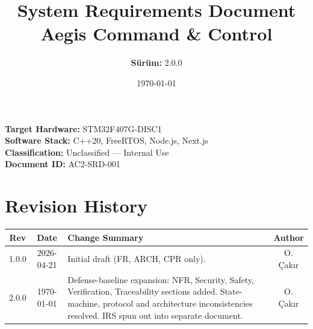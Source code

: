 \documentclass[11pt, a4paper]{article}
\title{
    \vspace{2cm}
    \Huge \textbf{System Requirements Document}\\
    \vspace{1cm}
    \LARGE \textbf{Aegis Command \& Control}\\
    \vspace{2cm}
}
\author{\Large \textbf{Sürüm:} 2.0.0}
\date{\vspace{1cm} \Large \today}
\begin{document}
\maketitle
\thispagestyle{empty}

\vspace{3cm}
\begin{center}
    \Large \textbf{Target Hardware:} STM32F407G-DISC1 \\
    \vspace{0.5cm}
    \Large \textbf{Software Stack:} C++20, FreeRTOS, Node.js, Next.js \\
    \vspace{0.5cm}
    \normalsize \textbf{Classification:} Unclassified — Internal Use \\
    \vspace{0.2cm}
    \normalsize \textbf{Document ID:} AC2-SRD-001
\end{center}

\newpage

\section*{Revision History}
\begin{tabularx}{\textwidth}{|c|c|X|c|}
\hline
\textbf{Rev} & \textbf{Date} & \textbf{Change Summary} & \textbf{Author} \\
\hline
1.0.0 & 2026-04-21 & Initial draft (FR, ARCH, CPR only). & O. Çakır \\
\hline
2.0.0 & \today & Defense-baseline expansion: NFR, Security, Safety, Verification, Traceability sections added. State-machine, protocol and architecture inconsistencies resolved. IRS spun out into separate document. & O. Çakır \\
\hline
\end{tabularx}

\newpage
{}
\tableofcontents
\newpage
{}












\appendix


\end{document}
